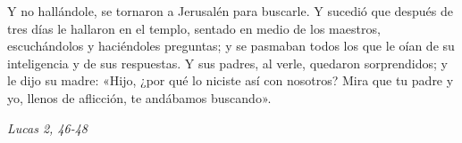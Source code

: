 \documentclass[../../devocionario.tex]{subfiles}
\begin{document}
    Y no hallándole, se tornaron a Jerusalén para buscarle. Y sucedió que después de tres días le hallaron en el templo, 
    sentado en medio de los maestros, escuchándolos y haciéndoles preguntas; y se pasmaban todos los que le oían de su 
    inteligencia y de sus respuestas. Y sus padres, al verle, quedaron sorprendidos; y le dijo su madre: 
    «Hijo, ¿por qué lo niciste así con nosotros? Mira que tu padre y yo, llenos de aflicción, te andábamos buscando». 
    \begin{flushright}
        \emph{Lucas 2, 46-48}
    \end{flushright}
\end{document}
